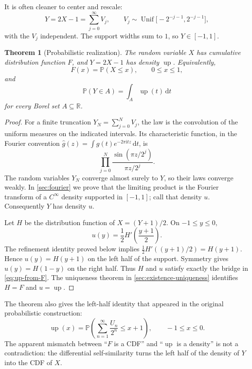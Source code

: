 \documentclass[11pt,oneside]{article}
\newtheorem{theorem}{Theorem}[section]
\theoremstyle{definition}
\theoremstyle{remark}
\newcommand{\upf}{\operatorname{up}}
\newcommand{\dd}{\,\mathrm d}
\newcommand{\ii}{\mathrm i}
\newcommand{\Pp}{\mathbb P}
\newcommand{\R}{\mathbb R}
\begin{document}
It is often cleaner to center and rescale:
\begin{equation}\label{eq:Y-random-series}
  Y=2X-1=\sum_{j=0}^{\infty}V_j,
  \qquad
  V_j\sim\operatorname{Unif}\bigl[-2^{-j-1},2^{-j-1}\bigr],
\end{equation}
with the $V_j$ independent.  The support widths sum to $1$, so $Y\in[-1,1]$.

\begin{theorem}[Probabilistic realization]\label{thm:prob-realization}
The random variable $X$ has cumulative distribution function $F$, and $Y=2X-1$
has density $\upf$.  Equivalently,
\begin{equation}\label{eq:F-as-probability}
  F(x)=\Pp(X\le x),\qquad 0\le x\le1,
\end{equation}
and
\begin{equation}\label{eq:up-density}
  \Pp(Y\in A)=\int_A\upf(t)\dd t
\end{equation}
for every Borel set $A\subseteq\R$.
\end{theorem}

\begin{proof}
For a finite truncation $Y_N=\sum_{j=0}^N V_j$, the law is the convolution of the
uniform measures on the indicated intervals.  Its characteristic function, in the
Fourier convention $\widehat g(z)=\int g(t)e^{-2\pi\ii tz}\dd t$, is
\begin{equation}\label{eq:finite-characteristic}
  \prod_{j=0}^{N}\frac{\sin(\pi z/2^j)}{\pi z/2^j}.
\end{equation}
The random variables $Y_N$ converge almost surely to $Y$, so their laws converge
weakly.  In \cref{sec:fourier} we prove that the limiting product is the Fourier
transform of a $C^\infty$ density supported in $[-1,1]$; call that density $u$.
Consequently $Y$ has density $u$.

Let $H$ be the distribution function of $X=(Y+1)/2$.  On $-1\le y\le0$,
\[
  u(y)=\frac12 H'\!\left(\frac{y+1}{2}\right).
\]
The refinement identity proved below implies
$\frac12H'((y+1)/2)=H(y+1)$.  Hence $u(y)=H(y+1)$ on the left half of the support.
Symmetry gives $u(y)=H(1-y)$ on the right half.  Thus $H$ and $u$ satisfy exactly
the bridge in \eqref{eq:up-from-F}.  The uniqueness theorem in
\cref{sec:existence-uniqueness} identifies $H=F$ and $u=\upf$.
\end{proof}

The theorem also gives the left-half identity that appeared in the original
probabilistic construction:
\begin{equation}\label{eq:up-left-prob}
  \upf(x)=\Pp\left(\sum_{n=1}^{\infty}\frac{U_n}{2^n}\le x+1\right),
  \qquad -1\le x\le0.
\end{equation}
The apparent mismatch between ``$F$ is a CDF'' and ``$\upf$ is a density'' is not a
contradiction: the differential self-similarity turns the left half of the density
of $Y$ into the CDF of $X$.
\end{document}
